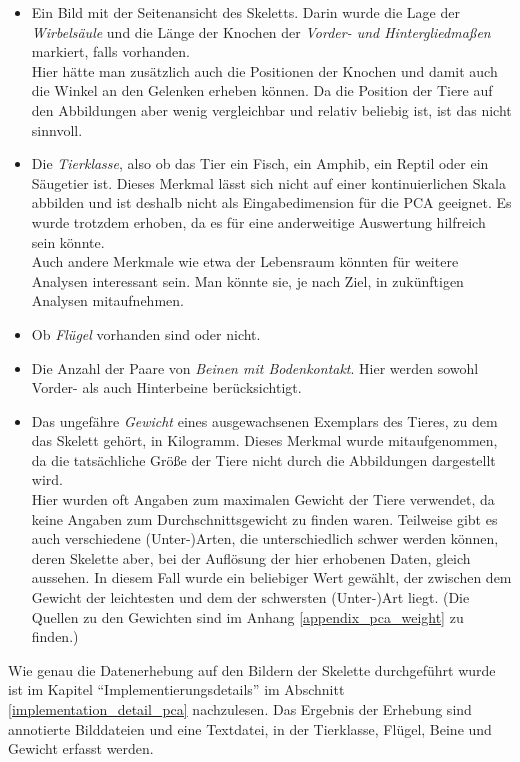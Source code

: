  \begin{itemize}
  \item Ein Bild mit der Seitenansicht des Skeletts.
  Darin wurde die Lage der \emph{Wirbelsäule} und die Länge der Knochen der \emph{Vorder- und Hintergliedmaßen} markiert, falls vorhanden.\\
  Hier hätte man zusätzlich auch die Positionen der Knochen und damit auch die Winkel an den Gelenken erheben können. Da die Position der Tiere auf den Abbildungen aber wenig vergleichbar und relativ beliebig ist, ist das nicht sinnvoll.
  
  \item Die \emph{Tierklasse}, also ob das Tier ein Fisch, ein Amphib, ein Reptil oder ein Säugetier ist. Dieses Merkmal lässt sich nicht auf einer kontinuierlichen Skala abbilden und ist deshalb nicht als Eingabedimension für die PCA geeignet. Es wurde trotzdem erhoben, da es für eine anderweitige Auswertung hilfreich sein könnte.\\
  Auch andere Merkmale wie etwa der Lebensraum könnten für weitere Analysen interessant sein. Man könnte sie, je nach Ziel, in zukünftigen Analysen mitaufnehmen.
  
  \item Ob \emph{Flügel} vorhanden sind oder nicht.
  
  \item Die Anzahl der Paare von \emph{Beinen mit Bodenkontakt}. Hier werden sowohl Vorder- als auch Hinterbeine berücksichtigt.
  
  \item Das ungefähre \emph{Gewicht} eines ausgewachsenen Exemplars des Tieres, zu dem das Skelett gehört, in Kilogramm. Dieses Merkmal wurde mitaufgenommen, da die tatsächliche Größe der Tiere nicht durch die Abbildungen dargestellt wird.\\
  Hier wurden oft Angaben zum maximalen Gewicht der Tiere verwendet, da keine Angaben zum Durchschnittsgewicht zu finden waren. Teilweise gibt es auch verschiedene (Unter-)Arten, die unterschiedlich schwer werden können, deren Skelette aber, bei der Auflösung der hier erhobenen Daten, gleich aussehen. In diesem Fall wurde ein beliebiger Wert gewählt, der zwischen dem Gewicht der leichtesten und dem der schwersten (Unter-)Art liegt. (Die Quellen zu den Gewichten sind im Anhang \ref{appendix_pca_weight} zu finden.)
 \end{itemize}

 Wie genau die Datenerhebung auf den Bildern der Skelette durchgeführt wurde ist im Kapitel "`Implementierungsdetails"' im Abschnitt \ref{implementation_detail_pca} nachzulesen.
 Das Ergebnis der Erhebung sind annotierte Bilddateien und eine Textdatei, in der Tierklasse, Flügel, Beine und Gewicht erfasst werden.
 

